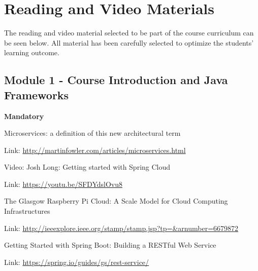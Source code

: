 
\section*{Reading and Video Materials}

The reading and video material selected to be part of the course curriculum can be seen below. All material has been carefully selected to optimize the students' learning outcome.

\subsection*{Module 1 - Course Introduction and Java Frameworks}

\textbf{Mandatory}
\begin{compactitem}	
\setlength\itemsep{0.05em}
  \item Microservices: a definition of this new architectural term
  \begin{compactitem}
  	\item Link: \url{http://martinfowler.com/articles/microservices.html} 
  \end{compactitem}
  
  \item Video: Josh Long: Getting started with Spring Cloud
  \begin{compactitem}
  	\item Link: \url{https://youtu.be/SFDYdslOvu8}
  \end{compactitem}
  
  \item The Glasgow Raspberry Pi Cloud: A Scale Model for Cloud Computing Infrastructures
  \begin{compactitem}
  	\item Link: \url{http://ieeexplore.ieee.org/stamp/stamp.jsp?tp=&arnumber=6679872}
  \end{compactitem}
  
  \item Getting Started with Spring Boot: Building a RESTful Web Service
  \begin{compactitem}
  	\item Link: \url{https://spring.io/guides/gs/rest-service/}
  \end{compactitem}
\end{compactitem}

